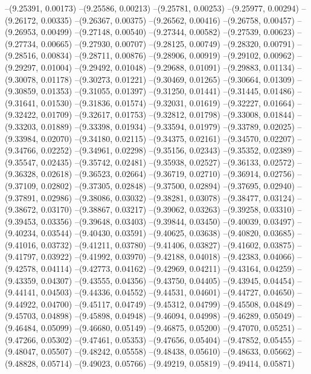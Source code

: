 --(9.25391, 0.00173)
--(9.25586, 0.00213)
--(9.25781, 0.00253)
--(9.25977, 0.00294)
--(9.26172, 0.00335)
--(9.26367, 0.00375)
--(9.26562, 0.00416)
--(9.26758, 0.00457)
--(9.26953, 0.00499)
--(9.27148, 0.00540)
--(9.27344, 0.00582)
--(9.27539, 0.00623)
--(9.27734, 0.00665)
--(9.27930, 0.00707)
--(9.28125, 0.00749)
--(9.28320, 0.00791)
--(9.28516, 0.00834)
--(9.28711, 0.00876)
--(9.28906, 0.00919)
--(9.29102, 0.00962)
--(9.29297, 0.01004)
--(9.29492, 0.01048)
--(9.29688, 0.01091)
--(9.29883, 0.01134)
--(9.30078, 0.01178)
--(9.30273, 0.01221)
--(9.30469, 0.01265)
--(9.30664, 0.01309)
--(9.30859, 0.01353)
--(9.31055, 0.01397)
--(9.31250, 0.01441)
--(9.31445, 0.01486)
--(9.31641, 0.01530)
--(9.31836, 0.01574)
--(9.32031, 0.01619)
--(9.32227, 0.01664)
--(9.32422, 0.01709)
--(9.32617, 0.01753)
--(9.32812, 0.01798)
--(9.33008, 0.01844)
--(9.33203, 0.01889)
--(9.33398, 0.01934)
--(9.33594, 0.01979)
--(9.33789, 0.02025)
--(9.33984, 0.02070)
--(9.34180, 0.02115)
--(9.34375, 0.02161)
--(9.34570, 0.02207)
--(9.34766, 0.02252)
--(9.34961, 0.02298)
--(9.35156, 0.02343)
--(9.35352, 0.02389)
--(9.35547, 0.02435)
--(9.35742, 0.02481)
--(9.35938, 0.02527)
--(9.36133, 0.02572)
--(9.36328, 0.02618)
--(9.36523, 0.02664)
--(9.36719, 0.02710)
--(9.36914, 0.02756)
--(9.37109, 0.02802)
--(9.37305, 0.02848)
--(9.37500, 0.02894)
--(9.37695, 0.02940)
--(9.37891, 0.02986)
--(9.38086, 0.03032)
--(9.38281, 0.03078)
--(9.38477, 0.03124)
--(9.38672, 0.03170)
--(9.38867, 0.03217)
--(9.39062, 0.03263)
--(9.39258, 0.03310)
--(9.39453, 0.03356)
--(9.39648, 0.03403)
--(9.39844, 0.03450)
--(9.40039, 0.03497)
--(9.40234, 0.03544)
--(9.40430, 0.03591)
--(9.40625, 0.03638)
--(9.40820, 0.03685)
--(9.41016, 0.03732)
--(9.41211, 0.03780)
--(9.41406, 0.03827)
--(9.41602, 0.03875)
--(9.41797, 0.03922)
--(9.41992, 0.03970)
--(9.42188, 0.04018)
--(9.42383, 0.04066)
--(9.42578, 0.04114)
--(9.42773, 0.04162)
--(9.42969, 0.04211)
--(9.43164, 0.04259)
--(9.43359, 0.04307)
--(9.43555, 0.04356)
--(9.43750, 0.04405)
--(9.43945, 0.04454)
--(9.44141, 0.04503)
--(9.44336, 0.04552)
--(9.44531, 0.04601)
--(9.44727, 0.04650)
--(9.44922, 0.04700)
--(9.45117, 0.04749)
--(9.45312, 0.04799)
--(9.45508, 0.04849)
--(9.45703, 0.04898)
--(9.45898, 0.04948)
--(9.46094, 0.04998)
--(9.46289, 0.05049)
--(9.46484, 0.05099)
--(9.46680, 0.05149)
--(9.46875, 0.05200)
--(9.47070, 0.05251)
--(9.47266, 0.05302)
--(9.47461, 0.05353)
--(9.47656, 0.05404)
--(9.47852, 0.05455)
--(9.48047, 0.05507)
--(9.48242, 0.05558)
--(9.48438, 0.05610)
--(9.48633, 0.05662)
--(9.48828, 0.05714)
--(9.49023, 0.05766)
--(9.49219, 0.05819)
--(9.49414, 0.05871)
